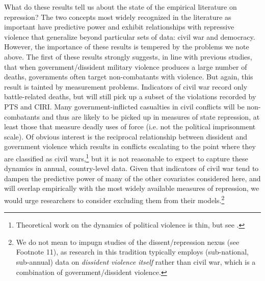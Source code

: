 \documentclass[11pt]{article}
\begin{document}
What do these results tell us about the state of the empirical literature on repression? The two concepts most widely recognized in the literature as important have predictive power and exhibit relationships with repressive violence that generalize beyond particular sets of data: civil war and democracy. However, the importance of these results is tempered by the problems we note above. The first of these results strongly suggests, in line with previous studies, that when government/dissident military violence produces a large number of deaths, governments often target non-combatants with violence. But again, this result is tainted by measurement problems. Indicators of civil war record only battle-related deaths, but will still pick up a subset of the violations recorded by PTS and CIRI. Many government-inflicted casualties in civil conflicts will be non-combatants and thus are likely to be picked up in measures of state repression, at least those that measure deadly uses of force (i.e. not the political imprisonment scale). Of obvious interest is the reciprocal relationship between dissident and government violence which results in conflicts escalating to the point where they are classified as civil wars,\footnote{Theoretical work on the dynamics of political violence is thin, but see \citet{Lichbach1987,Moore2000,Pierskalla2010,RitterJCR}.} but it is not reasonable to expect to capture these dynamics in annual, country-level data. Given that indicators of civil war tend to dampen the predictive power of many of the other covariates considered here, and will overlap empirically with the most widely available measures of repression, we would urge researchers to consider excluding them from their models.\footnote{We do not mean to impugn studies of the dissent/repression nexus (see Footnote 11), as research in this tradition typically employs (sub-national, sub-annual) data on {\em dissident violence itself} rather than civil war, which is a combination of government/dissident violence.}  
\end{document}
